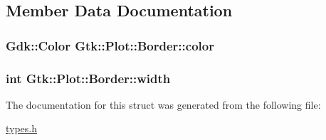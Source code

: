 \subsection{Member Data Documentation}
\hypertarget{structGtk_1_1Plot_1_1Border_ae1cf991b6276925a1c35c58343658b8e}{
\subsubsection[{color}]{\setlength{\rightskip}{0pt plus 5cm}Gdk::Color {\bf Gtk::Plot::Border::color}}}
\label{structGtk_1_1Plot_1_1Border_ae1cf991b6276925a1c35c58343658b8e}
\hypertarget{structGtk_1_1Plot_1_1Border_a15d421e0b7a30728752521b6940a8e0f}{
\subsubsection[{width}]{\setlength{\rightskip}{0pt plus 5cm}int {\bf Gtk::Plot::Border::width}}}
\label{structGtk_1_1Plot_1_1Border_a15d421e0b7a30728752521b6940a8e0f}


The documentation for this struct was generated from the following file:\begin{DoxyCompactItemize}
\item 
\hyperlink{types_8h}{types.h}\end{DoxyCompactItemize}
